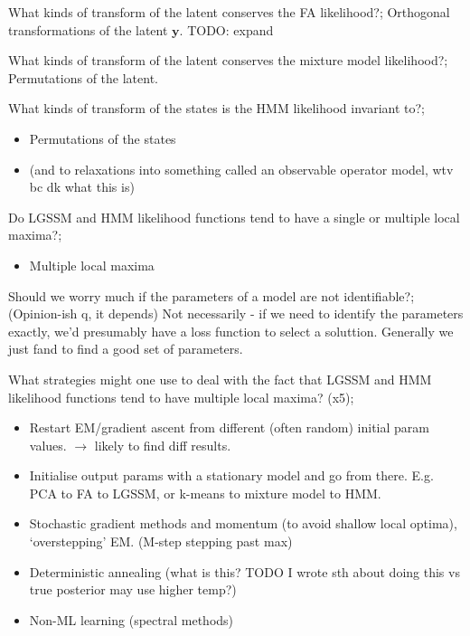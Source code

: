 \documentclass{article}
\begin{document}
What kinds of transform of the latent conserves the FA likelihood?; Orthogonal transformations of the latent $\mathbf{y}$. TODO: expand

What kinds of transform of the latent conserves the mixture model likelihood?; Permutations of the latent.

What kinds of transform of the states is the HMM likelihood invariant to?; \begin{itemize} \item Permutations of the states \item (and to relaxations into something called an observable operator model, wtv bc dk what this is) \end{itemize}

Do LGSSM and HMM likelihood functions tend to have a single or multiple local maxima?; \begin{itemize} \item Multiple local maxima \end{itemize}

Should we worry much if the parameters of a model are not identifiable?; (Opinion-ish q, it depends) Not necessarily - if we need to identify the parameters exactly, we'd presumably have a loss function to select a soluttion. Generally we just fand to find a good set of parameters.

What strategies might one use to deal with the fact that LGSSM and HMM likelihood functions tend to have multiple local maxima? (x5); \begin{itemize} \item Restart EM/gradient ascent from different (often random) initial param values. $\rightarrow$ likely to find diff results. \item Initialise output params with a stationary model and go from there. E.g. PCA to FA to LGSSM, or k-means to mixture model to HMM. \item Stochastic gradient methods and momentum (to avoid shallow local optima), `overstepping' EM. (M-step stepping past max) \item Deterministic annealing (what is this? TODO I wrote sth about doing this vs true posterior may use higher temp?) \item Non-ML learning (spectral methods) \end{itemize}
\end{document}
